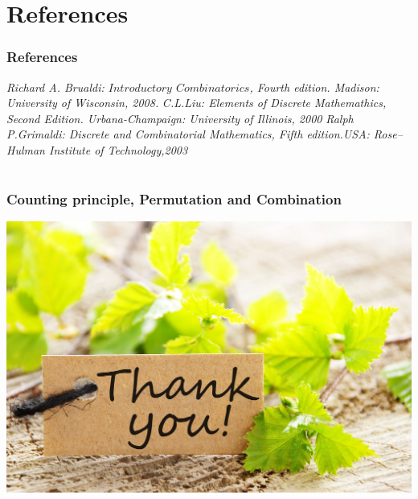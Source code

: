 \documentclass{beamer}
\begin{document}
\section{References}
\begin{frame}
 \frametitle{References}
 \begin{thebibliography}{5}
   \emph{  Richard A. Brualdi: $Introductory$ $Combinatorics$, Fourth edition. Madison: University of Wisconsin, 2008.}{\vspace{.6cm}}
     \emph{C.L.Liu: Elements of Discrete Mathemathics, Second Edition. Urbana-Champaign: University of Illinois, 2000 }{\vspace{.6cm}}
       \emph{Ralph P.Grimaldi: Discrete and Combinatorial Mathematics, Fifth edition.USA: Rose–Hulman Institute of Technology,2003}{\vspace{1cm}}
 \end{thebibliography}
 \end{frame}
 
\section{}
 \begin{frame}
\frametitle{ Counting principle, Permutation and Combination}
\includegraphics[width=\textwidth]{Thank-You-Card.jpg}
\end{frame}
\end{document}

